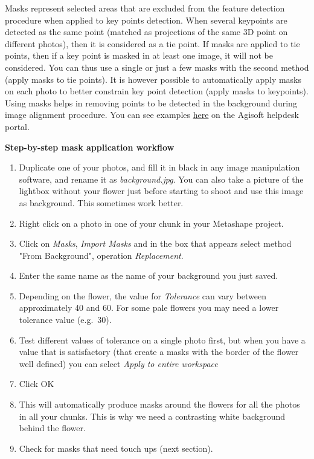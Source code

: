 \documentclass[
]{book}
\theoremstyle{definition}
\theoremstyle{definition}
\theoremstyle{definition}
\theoremstyle{definition}
\theoremstyle{remark}
\begin{document}
Masks represent selected areas that are excluded from the feature
detection procedure when applied to key points detection. When several
keypoints are detected as the same point (matched as projections of the
same 3D point on different photos), then it is considered as a tie
point. If masks are applied to tie points, then if a key point is masked
in at least one image, it will not be considered. You can thus use a
single or just a few masks with the second method (apply masks to tie
points). It is however possible to automatically apply masks on each
photo to better constrain key point detection (apply masks to
keypoints). Using masks helps in removing points to be detected in the
background during image alignment procedure. You can see examples
\href{https://agisoft.freshdesk.com/support/solutions/articles/31000158967-aligning-turntable-photos-with-background-suppression-from-single-mask-in-agisoft-metashape}{here}
on the Agisoft helpdesk portal.

\textbf{Step-by-step mask application workflow}

\begin{enumerate}
\def\labelenumi{\arabic{enumi}.}
\item
  Duplicate one of your photos, and fill it in black in any image
  manipulation software, and rename it as \emph{background.jpg}. You can
  also take a picture of the lightbox without your flower just before
  starting to shoot and use this image as background. This sometimes
  work better.
\item
  Right click on a photo in one of your chunk in your Metashape
  project.
\item
  Click on \emph{Masks}, \emph{Import Masks} and in the box that appears select
  method "From Background", operation \emph{Replacement}.
\item
  Enter the same name as the name of your background you just saved.
\item
  Depending on the flower, the value for \emph{Tolerance} can vary between
  approximately 40 and 60. For some pale flowers you may need a lower
  tolerance value (e.g.~30).
\item
  Test different values of tolerance on a single photo first, but when
  you have a value that is satisfactory (that create a masks with the
  border of the flower well defined) you can select \emph{Apply to entire
  workspace}
\item
  Click OK
\item
  This will automatically produce masks around the flowers for all the
  photos in all your chunks. This is why we need a contrasting white
  background behind the flower.
\item
  Check for masks that need touch ups (next section).
\end{enumerate}
\end{document}
